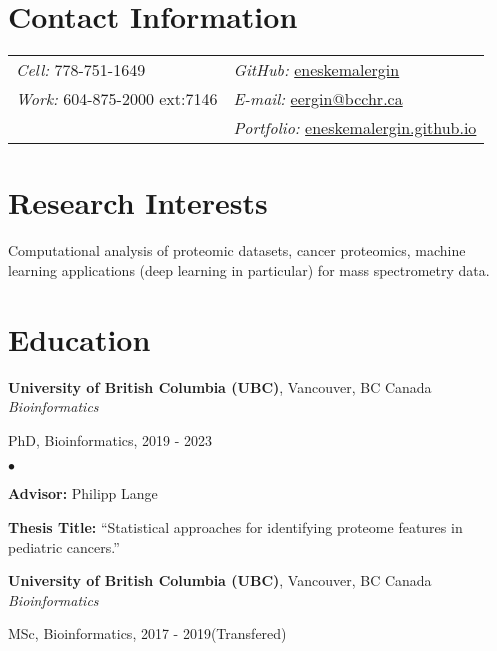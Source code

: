 \documentclass[margin,line]{res}
\newenvironment{list1}{
  \begin{list}{\ding{113}}{%
      \setlength{\itemsep}{0in}
      \setlength{\parsep}{0in} \setlength{\parskip}{0in}
      \setlength{\topsep}{0in} \setlength{\partopsep}{0in}
      \setlength{\leftmargin}{0.17in}}}{\end{list}}
\newenvironment{list2}{
  \begin{list}{$\bullet$}{%
      \setlength{\itemsep}{0in}
      \setlength{\parsep}{0in} \setlength{\parskip}{0in}
      \setlength{\topsep}{0in} \setlength{\partopsep}{0in}
      \setlength{\leftmargin}{0.2in}}}{\end{list}}
\begin{document}

\begin{resume}
\section{\sc Contact Information}
\vspace{.05in}
\begin{tabular}{@{}p{2in}p{4in}}
{\it Cell:} 778-751-1649               & \hfill {\it GitHub:}  \href{https://github.com/eneskemalergin}{eneskemalergin} \\
{\it Work:} 604-875-2000 ext:7146    & \hfill {\it E-mail:}  \href{mailto:eergin@bcchr.ca}{eergin@bcchr.ca}\\
                                    & \hfill {\it Portfolio:}  \href{eneskemalergin.github.io}{eneskemalergin.github.io} \\
\end{tabular}


\section{\sc Research Interests}
Computational analysis of proteomic datasets, cancer proteomics, machine learning applications (deep learning in particular) for mass spectrometry data.

\section{\sc Education}

{\bf University of British Columbia (UBC)}, Vancouver, BC Canada\\
{\em Bioinformatics}
\begin{list1}
\item[]  PhD, Bioinformatics, 2019 - 2023
\begin{list2}
\vspace*{.05in}
\item {\bf Advisor:}  Philipp Lange
\item {\bf Thesis Title:}  ``Statistical approaches for identifying proteome features in pediatric cancers.''
\end{list2}
\end{list1}

{\bf University of British Columbia (UBC)}, Vancouver, BC Canada\\
{\em Bioinformatics}
\begin{list1}
\item[]  MSc, Bioinformatics, 2017 - 2019(Transfered)
\end{list1}


\end{resume}
\end{document}
